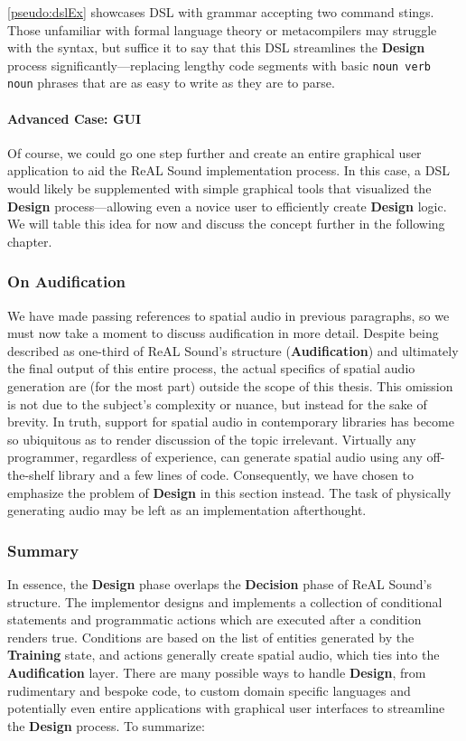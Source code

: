 \documentclass{report}
\newcommand{\rs}{ReAL Sound\xspace}
\newcommand{\train}{\textbf{Training}\xspace}
\newcommand{\design}{\textbf{Design}\xspace}
\newcommand{\decision}{\textbf{Decision}\xspace}
\newcommand{\audio}{\textbf{Audification}\xspace}
\newcommand{\imp}{implementor\xspace}
\begin{document}
\cref{pseudo:dslEx} showcases DSL with grammar accepting two command stings. Those unfamiliar with formal language theory or metacompilers may struggle with the syntax, but suffice it to say that this DSL streamlines the \design process significantly---replacing lengthy code segments with basic \texttt{noun verb noun} phrases that are as easy to write as they are to parse.

\paragraph{Advanced Case: GUI}
Of course, we could go one step further and create an entire graphical user application to aid the \rs implementation process. In this case, a DSL would likely be supplemented with simple graphical tools that visualized the \design process---allowing even a novice user to efficiently create \design logic. We will table this idea for now and discuss the concept further in the following chapter.  

\subsubsection{On Audification}
We have made passing references to spatial audio in previous paragraphs, so we must now take a moment to discuss audification in more detail. Despite being described as one-third of \rs's structure (\audio) and ultimately the final output of this entire process, the actual specifics of spatial audio generation are (for the most part) outside the scope of this thesis. This omission is not due to the subject's complexity or nuance, but instead for the sake of brevity. In truth, support for spatial audio in contemporary libraries has become so ubiquitous as to render discussion of the topic irrelevant. Virtually any programmer, regardless of experience, can generate spatial audio using any off-the-shelf library and a few lines of code. Consequently, we have chosen to emphasize the problem of \design in this section instead. The task of physically generating audio may be left as an implementation afterthought. 

\subsubsection{Summary}
In essence, the \design phase overlaps the \decision phase of \rs's structure. The \imp designs and implements a collection of conditional statements and programmatic actions which are executed after a condition renders true. Conditions are based on the list of entities generated by the \train state, and actions generally create spatial audio, which ties into the \audio layer. There are many possible ways to handle \design, from rudimentary and bespoke code, to custom domain specific languages and potentially even entire applications with graphical user interfaces to streamline the \design process. 
To summarize:
\end{document}
